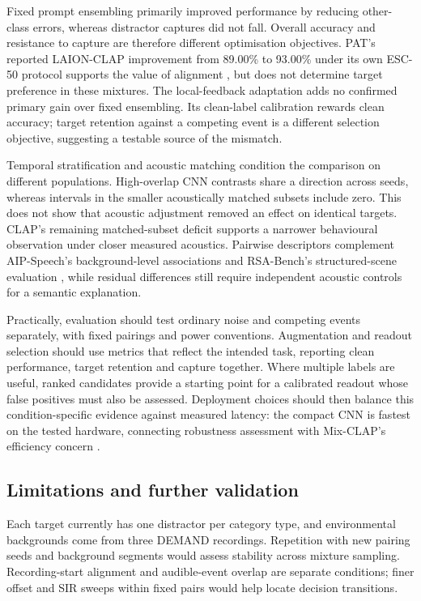 \documentclass[a4paper,10pt]{article}
\begin{document}
Fixed prompt ensembling primarily improved performance by reducing other-class errors, whereas distractor captures did not fall. Overall accuracy and resistance to capture are therefore different optimisation objectives. PAT's reported LAION-CLAP improvement from 89.00\% to 93.00\% under its own ESC-50 protocol supports the value of alignment \cite{pat}, but does not determine target preference in these mixtures. The local-feedback adaptation adds no confirmed primary gain over fixed ensembling. Its clean-label calibration rewards clean accuracy; target retention against a competing event is a different selection objective, suggesting a testable source of the mismatch.

Temporal stratification and acoustic matching condition the comparison on different populations. High-overlap CNN contrasts share a direction across seeds, whereas intervals in the smaller acoustically matched subsets include zero. This does not show that acoustic adjustment removed an effect on identical targets. CLAP's remaining matched-subset deficit supports a narrower behavioural observation under closer measured acoustics. Pairwise descriptors complement AIP-Speech's background-level associations \cite{aip} and RSA-Bench's structured-scene evaluation \cite{rsa}, while residual differences still require independent acoustic controls for a semantic explanation.

Practically, evaluation should test ordinary noise and competing events separately, with fixed pairings and power conventions. Augmentation and readout selection should use metrics that reflect the intended task, reporting clean performance, target retention and capture together. Where multiple labels are useful, ranked candidates provide a starting point for a calibrated readout whose false positives must also be assessed. Deployment choices should then balance this condition-specific evidence against measured latency: the compact CNN is fastest on the tested hardware, connecting robustness assessment with Mix-CLAP's efficiency concern \cite{mixclap}.

\subsection{Limitations and further validation}

Each target currently has one distractor per category type, and environmental backgrounds come from three DEMAND recordings. Repetition with new pairing seeds and background segments would assess stability across mixture sampling. Recording-start alignment and audible-event overlap are separate conditions; finer offset and SIR sweeps within fixed pairs would help locate decision transitions.
\end{document}
